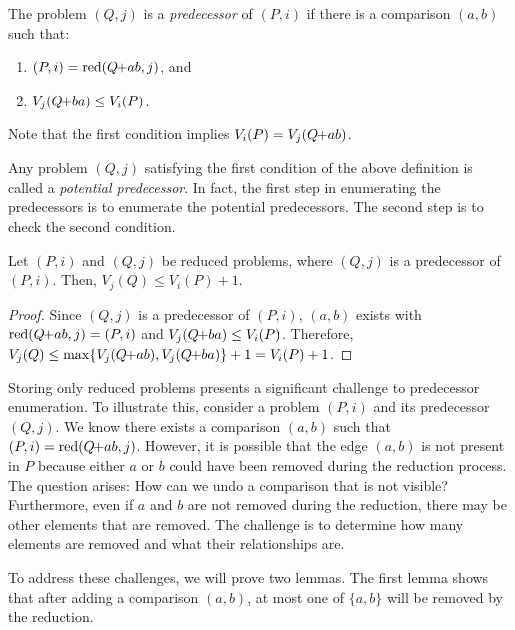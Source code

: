 \documentclass[a4paper,UKenglish,cleveref, autoref, thm-restate]{lipics-v2021}
\newcommand{\pchild}[3]{{#1}\kern-1pt{+}{#2}{#3}}
\newcommand{\reduced}[1]{\operatorname{red}#1}
\begin{document}
\begin{definition}[Predecessor] \label{definition:predecessor_calculation}
  The problem $(Q, j)$ is a \emph{predecessor} of $(P, i)$ if there is a comparison $(a, b)$ such that:
  \begin{enumerate}
    \item $(P, i) = \reduced(\pchild{Q}{a}{b}, j)$, and
    \item $V_j(\pchild{Q}{b}{a}) \leq V_i(P)$.
  \end{enumerate}
\end{definition}

Note that the first condition implies $V_i(P) = V_j(\pchild{Q}{a}{b})$.

Any problem $(Q, j)$ satisfying the first condition of the above definition is called a \emph{potential predecessor}.
In fact, the first step in enumerating the predecessors is to enumerate the potential predecessors.
The second step is to check the second condition.

\begin{lemma} \label{lemma:predecessor_calculation}
  Let $(P, i)$ and $(Q, j)$ be reduced problems, where $(Q, j)$ is a predecessor of $(P, i)$.
  Then, $V_j(Q) \leq V_i(P) + 1$.
\end{lemma}

\begin{proof} \label{proof:predecessor_calculation}
  Since $(Q, j)$ is a predecessor of $(P, i)$, $(a, b)$ exists with $\reduced{(\pchild{Q}{a}{b}, j)} = (P, i)$ and $V_j(\pchild{Q}{b}{a}) \leq V_i(P)$.
  Therefore, $V_j(Q) \leq \max\{V_j(\pchild{Q}{a}{b}), V_j(\pchild{Q}{b}{a})\} + 1 = V_i(P) + 1$.
\end{proof}

Storing only reduced problems presents a significant challenge to predecessor enumeration.
To illustrate this, consider a problem $(P, i)$ and its predecessor $(Q, j)$.
We know there exists a comparison $(a, b)$ such that $(P, i) = \reduced(\pchild{Q}{a}{b}, j)$.
However, it is possible that the edge $(a, b)$ is not present in $P$ because either $a$ or $b$ could have been removed during the reduction process.
The question arises: How can we undo a comparison that is not visible?
Furthermore, even if $a$ and $b$ are not removed during the reduction, there may be other elements that are removed.
The challenge is to determine how many elements are removed and what their relationships are.

To address these challenges, we will prove two lemmas.
The first lemma shows that after adding a comparison $(a, b)$, at most one of $\{a, b\}$ will be removed by the reduction.
\end{document}
